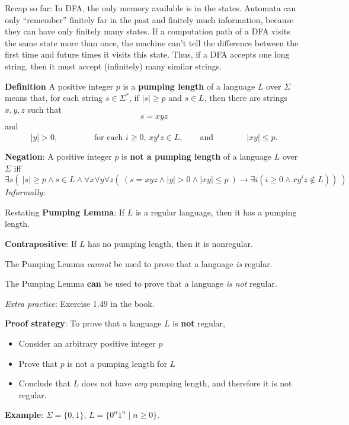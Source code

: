 \documentclass[12pt, oneside]{article}
\begin{document}
Recap so far: In DFA, the only memory available is in the states. Automata can only
``remember'' finitely far in the past and finitely much information, because
they can have only finitely many states. If a computation path of a DFA visits 
the same state more than once, the machine can't tell the difference between 
the first time and future times it visits this state. Thus, if 
a DFA accepts one long string, then it must accept (infinitely) many 
similar strings.

{\bf Definition}  A positive integer $p$ is a {\bf pumping length} of a language $L$ over $\Sigma$ means
that, for each string $s  \in  \Sigma^*$, if  $|s| \geq p$ and $s \in L$, then there are strings $x,y,z$
such that 
\[
s = xyz
\]
and  
\[
|y| > 0,  \qquad \qquad 
\text{ for each $i \geq 0$, $xy^i z \in L$}, \qquad \text{and}
\qquad  \qquad
|xy| \leq p.
\]

{\bf Negation}: A positive integer  $p$  is {\bf not a pumping length} of a language  $L$ over  $\Sigma$  iff
\[
\exists s \left(~  |s| \geq  p \wedge s \in L \wedge \forall x \forall y \forall z  \left( ~\left( s = xyz \wedge 
|y| > 0 \wedge |xy| \leq p~ \right) \to \exists i  (  i \geq 0  \wedge xy^iz  \notin L ) \right) ~\right) 
\]
{\it Informally: }


Restating {\bf Pumping Lemma}: If $L$ is a regular language, then it  has
a pumping length.


{\bf Contrapositive}: If $L$ has no pumping length, then  it is nonregular.

\vfill

{\Large The Pumping Lemma {\it cannot} be used to prove that a language {\it is} regular.} 

{\Large The Pumping Lemma {\bf can} be used to prove that a language {\it is not} regular.}

{\it Extra practice}: Exercise 1.49 in the book.


\vfill

{\bf Proof strategy}: To prove that a language $L$ is {\bf not} regular, 
\begin{itemize}
    \item Consider an arbitrary positive integer $p$
    \item Prove that $p$ is not a pumping length for $L$
    \item Conclude that $L$ does not have {\it any} pumping length, and therefore it is not regular.
\end{itemize}

\newpage
{\bf Example}: $\Sigma  =  \{0,1\}$, $L = \{ 0^n 1^n \mid n  \geq 0\}$.
\end{document}
